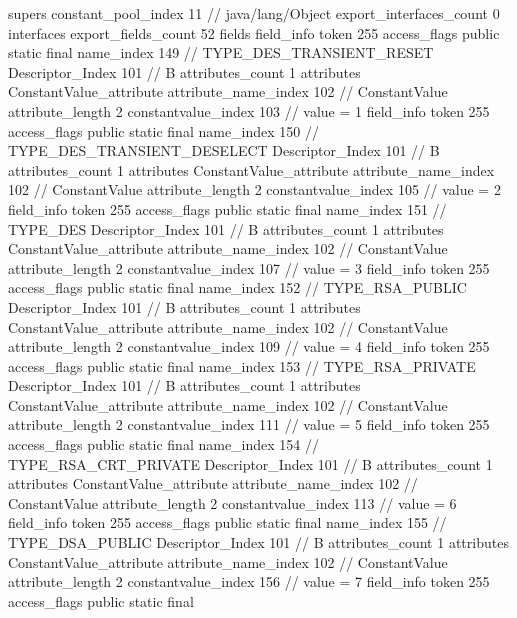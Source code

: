 {{{			supers {
				constant_pool_index	11		// java/lang/Object
			}
			export_interfaces_count	0
			interfaces {
			}
			export_fields_count	52
			fields {
			field_info {
				token	255
				access_flags	public static final
				name_index	149		// TYPE_DES_TRANSIENT_RESET
				Descriptor_Index	101		// B
				attributes_count	1
				attributes {
				ConstantValue_attribute {
					attribute_name_index	102		// ConstantValue
					attribute_length	2
					constantvalue_index	103		// value = 1
				}
				}
			}
			field_info {
				token	255
				access_flags	public static final
				name_index	150		// TYPE_DES_TRANSIENT_DESELECT
				Descriptor_Index	101		// B
				attributes_count	1
				attributes {
				ConstantValue_attribute {
					attribute_name_index	102		// ConstantValue
					attribute_length	2
					constantvalue_index	105		// value = 2
				}
				}
			}
			field_info {
				token	255
				access_flags	public static final
				name_index	151		// TYPE_DES
				Descriptor_Index	101		// B
				attributes_count	1
				attributes {
				ConstantValue_attribute {
					attribute_name_index	102		// ConstantValue
					attribute_length	2
					constantvalue_index	107		// value = 3
				}
				}
			}
			field_info {
				token	255
				access_flags	public static final
				name_index	152		// TYPE_RSA_PUBLIC
				Descriptor_Index	101		// B
				attributes_count	1
				attributes {
				ConstantValue_attribute {
					attribute_name_index	102		// ConstantValue
					attribute_length	2
					constantvalue_index	109		// value = 4
				}
				}
			}
			field_info {
				token	255
				access_flags	public static final
				name_index	153		// TYPE_RSA_PRIVATE
				Descriptor_Index	101		// B
				attributes_count	1
				attributes {
				ConstantValue_attribute {
					attribute_name_index	102		// ConstantValue
					attribute_length	2
					constantvalue_index	111		// value = 5
				}
				}
			}
			field_info {
				token	255
				access_flags	public static final
				name_index	154		// TYPE_RSA_CRT_PRIVATE
				Descriptor_Index	101		// B
				attributes_count	1
				attributes {
				ConstantValue_attribute {
					attribute_name_index	102		// ConstantValue
					attribute_length	2
					constantvalue_index	113		// value = 6
				}
				}
			}
			field_info {
				token	255
				access_flags	public static final
				name_index	155		// TYPE_DSA_PUBLIC
				Descriptor_Index	101		// B
				attributes_count	1
				attributes {
				ConstantValue_attribute {
					attribute_name_index	102		// ConstantValue
					attribute_length	2
					constantvalue_index	156		// value = 7
				}
				}
			}
			field_info {
				token	255
				access_flags	public static final
}}}}}

